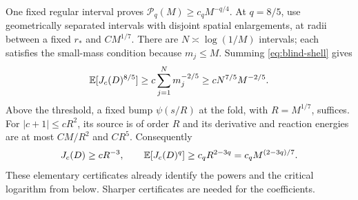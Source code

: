 One fixed regular interval proves $\mathcal P_q(M)\ge c_qM^{-q/4}$.
At $q=8/5$, use geometrically separated intervals with disjoint spatial
enlargements, at radii between a fixed $r_*$ and $CM^{1/7}$.
There are $N\asymp\log(1/M)$ intervals; each satisfies the small-mass
condition because $m_j\le M$. Summing \eqref{eq:blind-shell} gives
\[
 \mathbb E[J_c(D)^{8/5}]\ge c\sum_{j=1}^Nm_j^{-2/5}
       \ge cN^{7/5}M^{-2/5}.
\]
Above the threshold, a fixed bump $\psi(s/R)$ at the fold, with
$R=M^{1/7}$, suffices. For $|c+1|\le cR^2$, its source is of order
$R$ and its derivative and reaction energies are at most
$CM/R^2$ and $CR^5$. Consequently
\begin{equation}\label{eq:blind-fold-bump}
 J_c(D)\ge cR^{-3},\qquad
 \mathbb E[J_c(D)^q]\ge c_qR^{2-3q}=c_qM^{(2-3q)/7}.
\end{equation}
These elementary certificates already identify the powers and the
critical logarithm from below. Sharper certificates are needed for
the coefficients.

